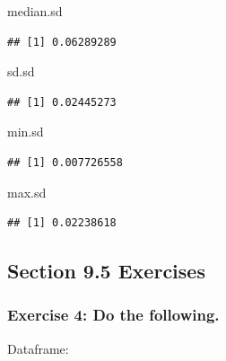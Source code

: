 \documentclass[
]{article}
\newenvironment{Shaded}{\begin{snugshade}}{\end{snugshade}}
\newcommand{\NormalTok}[1]{#1}
\begin{document}
\begin{Shaded}
\begin{Highlighting}[]
\NormalTok{median.sd}
\end{Highlighting}
\end{Shaded}

\begin{verbatim}
## [1] 0.06289289
\end{verbatim}

\begin{Shaded}
\begin{Highlighting}[]
\NormalTok{sd.sd}
\end{Highlighting}
\end{Shaded}

\begin{verbatim}
## [1] 0.02445273
\end{verbatim}

\begin{Shaded}
\begin{Highlighting}[]
\NormalTok{min.sd}
\end{Highlighting}
\end{Shaded}

\begin{verbatim}
## [1] 0.007726558
\end{verbatim}

\begin{Shaded}
\begin{Highlighting}[]
\NormalTok{max.sd}
\end{Highlighting}
\end{Shaded}

\begin{verbatim}
## [1] 0.02238618
\end{verbatim}

\hypertarget{section-9.5-exercises}{%
\subsection{Section 9.5 Exercises}\label{section-9.5-exercises}}

\hypertarget{exercise-4-do-the-following.}{%
\subsubsection{Exercise 4: Do the
following.}\label{exercise-4-do-the-following.}}

Dataframe:
\end{document}
